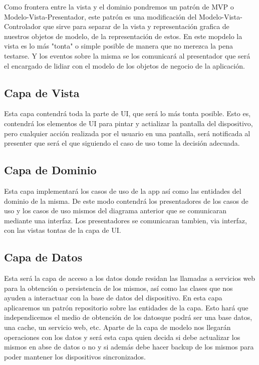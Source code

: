 \documentclass[../pfc.tex]{subfiles}
\begin{document}
	Como frontera entre la vista y el dominio pondremos un patrón de MVP o Modelo-Vista-Presentador, este patrón es una modificación del Modelo-Vista-Controlador que sirve para separar de la vista y representación grafica de nuestros objetos de modelo, de la representación de estos. En este mopdelo la vista es lo más "tonta" o simple posible de manera que no merezca la pena testarse. Y los eventos sobre la misma se los comunicará al presentador que será el encargado de lidiar con el modelo de los objetos de negocio de la aplicación.  
	
	\subsection{Capa de Vista}
	
	Esta capa contendrá toda la parte de UI, que será lo más tonta posible. Esto es, contendrá los elementos de UI para pintar y actializar la pantalla del dispositivo, pero cualquier acción realizada por el usuario en una pantalla, será notificada al presenter que será el que siguiendo el caso de uso tome la decisión adecuada.\\ 
	
	
	\subsection{Capa de Dominio}
	
	Esta capa implementará los casos de uso de la app así como las entidades del dominio de la misma. De este modo contendrá los presentadores de los casos de uso y los casos de uso mismos del diagrama anterior que se comunicaran mediante una interfaz. Los presentadores se comunicaran tambien, via interfaz, con las vistas tontas de la capa de UI.\\
	
	
	\subsection{Capa de Datos}
	
	Esta será la capa de acceso a los datos donde residan las llamadas a servicios web para la obtención o persistencia de los mismos, así como las clases que nos ayuden a interactuar con la base de datos del dispositivo. En esta capa aplicaremos un patrón repositorio sobre las entidades de la capa. Esto hará que independicemos el medio de obtención de los datosque podrá ser una base datos, una cache, un servicio web, etc.
	Aparte de la capa de modelo nos llegarán operaciones con los datos y será esta capa quien decida si debe actualizar los mismos en abse de datos o no y si además debe hacer backup de los mismos para poder mantener los dispositivos sincronizados.\\
	
\end{document}
